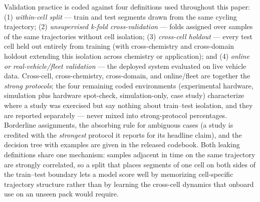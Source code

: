 \documentclass[journal]{IEEEtran}
\begin{document}
Validation practice is coded against four definitions used throughout this paper: (1) \textit{within-cell split} --- train and test segments drawn from the same cycling trajectory; (2) \textit{unsupervised k-fold cross-validation} --- folds assigned over samples of the same trajectories without cell isolation; (3) \textit{cross-cell holdout} --- every test cell held out entirely from training (with cross-chemistry and cross-domain holdout extending this isolation across chemistry or application); and (4) \textit{online or real-vehicle/fleet validation} --- the deployed system evaluated on live vehicle data. Cross-cell, cross-chemistry, cross-domain, and online/fleet are together the \textit{strong protocols}; the four remaining coded environments (experimental hardware, simulation plus hardware spot-check, simulation-only, case study) characterize where a study was exercised but say nothing about train--test isolation, and they are reported separately --- never mixed into strong-protocol percentages. Borderline assignments, the absorbing rule for ambiguous cases (a study is credited with the \textit{strongest} protocol it reports for its headline claim), and the decision tree with examples are given in the released codebook. Both leaking definitions share one mechanism: samples adjacent in time on the same trajectory are strongly correlated, so a split that places segments of one cell on both sides of the train--test boundary lets a model score well by memorizing cell-specific trajectory structure rather than by learning the cross-cell dynamics that onboard use on an unseen pack would require.
\end{document}
